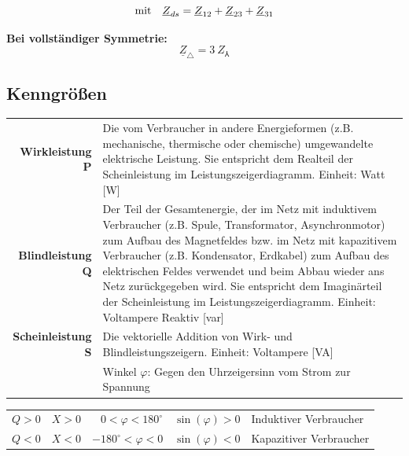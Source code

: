 \documentclass[11pt]{article}
\begin{document}
\begin{spacing}{0.1}
\begin{multicols}{2}
\[
	\textnormal{mit} \quad \underline{Z}_{ds}=\underline{Z}_{12} + \underline{Z}_{23} + \underline{Z}_{31}
\]
\end{multicols}

\vspace{1.5em}
\sffamily\textbf{Bei vollständiger Symmetrie:}
\[
	\underline Z_\triangle = 3 ~ Z_\Yup
\]

\newpage
\rmfamily

\subsection*{Kenngrößen}
\begin{center}
\bgroup
\begin{longtable}{r p{12cm}}
	\textbf{Wirkleistung P} & Die vom Verbraucher in andere Energieformen (z.B. mechanische, thermische oder chemische) umgewandelte elektrische Leistung. Sie entspricht dem Realteil der Scheinleistung im Leistungszeigerdiagramm. \newline Einheit: Watt [W] \\
	[2mm]
	\textbf{Blindleistung Q} & Der Teil der Gesamtenergie, der im Netz mit induktivem Verbraucher (z.B. Spule, Transformator, Asynchronmotor) zum Aufbau des Magnetfeldes bzw. im Netz mit kapazitivem Verbraucher (z.B. Kondensator, Erdkabel) zum Aufbau des elektrischen Feldes verwendet und beim Abbau wieder ans Netz zurückgegeben wird. Sie entspricht dem Imaginärteil der Scheinleistung im Leistungszeigerdiagramm.\newline
	Einheit: Voltampere Reaktiv [var] \\
	[2mm]
	\textbf{Scheinleistung S} & Die vektorielle Addition von Wirk- und Blindleistungszeigern.\newline
	Einheit: Voltampere [VA] \\
	[2mm]
	\pbox{20cm}{\textbf{Phasenverschiebung}} & Winkel $\varphi$: Gegen den Uhrzeigersinn vom Strom zur Spannung \\
\end{longtable}
\egroup
\end{center}
\begin{table}[H]
\centering
\begin{mdframed}[leftmargin=10pt,rightmargin=10pt]
\begin{tabular}{r | r | r | r | l}
	$Q > 0$ & $X > 0$ & $0 < \varphi < 180^\circ$ & $\sin(\varphi) > 0$ & Induktiver Verbraucher \\
	$Q < 0$ & $X < 0$ & $-180^\circ < \varphi < 0$ & $\sin(\varphi) < 0$ & Kapazitiver Verbraucher
\end{tabular}
\end{mdframed}
\end{table}


\end{spacing}
\end{document}
